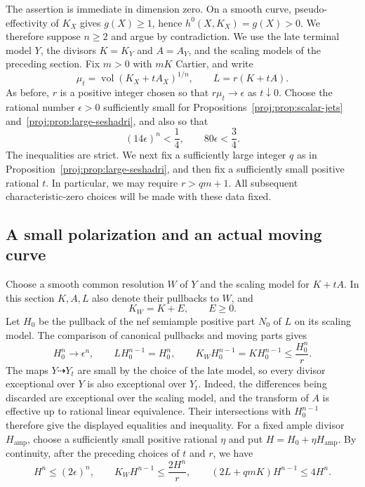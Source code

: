 \documentclass[11pt,letterpaper]{article}
\DeclareMathOperator{\vol}{vol}
\theoremstyle{definition}
\theoremstyle{remark}
\begin{document}
The assertion is immediate in dimension zero. On a smooth curve,
pseudo-effectivity of \(K_X\) gives \(g(X)\geq1\), hence
\(h^0(X,K_X)=g(X)>0\). We therefore suppose \(n\geq2\) and argue by
contradiction. We use the late terminal model \(Y\), the divisors
\(K=K_Y\) and \(A=A_Y\), and the scaling models of the preceding
section. Fix \(m>0\) with \(mK\) Cartier, and write
\[
 \mu_t=\vol(K_X+tA_X)^{1/n},\qquad
 L=r(K+tA).
\]
As before, \(r\) is a positive integer chosen so that
\(r\mu_t\longrightarrow\epsilon\) as \(t\downarrow0\).
Choose the rational number \(\epsilon>0\) sufficiently small for
Propositions~\ref{proj:prop:scalar-jets} and~\ref{proj:prop:large-seshadri}, and also
so that
\begin{equation}
\label{proj:fr:epsilon}
 (14\epsilon)^n<\frac14,\qquad
 80\epsilon<\frac34.
\end{equation}
The inequalities are strict. We next fix a sufficiently large integer
\(q\) as in Proposition~\ref{proj:prop:large-seshadri}, and then fix a
sufficiently small positive rational \(t\). In particular, we may require
\(r>qm+1\). All subsequent characteristic-zero choices will be made with
these data fixed.

\subsection{A small polarization and an actual moving curve}

Choose a smooth common resolution \(W\) of \(Y\) and the scaling model
for \(K+tA\). In this section \(K,A,L\) also denote their pullbacks to
\(W\), and
\[
 K_W=K+E,\qquad E\geq0.
\]
Let \(H_0\) be the pullback of the nef semiample positive part \(N_0\) of
\(L\) on its scaling model. The comparison of canonical pullbacks and
moving parts gives
\begin{equation}
\label{proj:fr:limit-intersections}
 H_0^n\longrightarrow\epsilon^n,\qquad
 LH_0^{n-1}=H_0^n,\qquad
 K_WH_0^{n-1}=KH_0^{n-1}\leq\frac{H_0^n}{r}.
\end{equation}
The maps \(Y\dashrightarrow Y_t\) are small by the choice of the late
model, so every divisor exceptional over \(Y\) is also exceptional
over \(Y_t\).
Indeed, the differences being discarded are exceptional over the
scaling model, and the transform of \(A\) is effective up to rational
linear equivalence. Their intersections with \(H_0^{n-1}\) therefore
give the displayed equalities and inequality. For a fixed ample divisor
\(H_{\mathrm{amp}}\), choose a sufficiently small positive rational
\(\eta\) and put \(H=H_0+\eta H_{\mathrm{amp}}\). By continuity, after
the preceding choices of \(t\) and \(r\), we have
\begin{equation}
\label{proj:fr:intersection-bounds}
 H^n\leq(2\epsilon)^n,\qquad
 K_WH^{n-1}\leq\frac{2H^n}{r},\qquad
 (2L+qmK)H^{n-1}\leq4H^n.
\end{equation}
\end{document}
